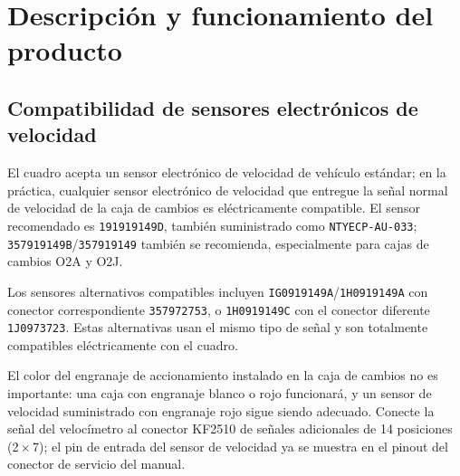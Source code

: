 \chapter{Descripci\'on y funcionamiento del producto}\label{ch:description}

\section{Compatibilidad de sensores electr\'onicos de velocidad}
El cuadro acepta un sensor electr\'onico de velocidad de veh\'iculo est\'andar; en la pr\'actica, cualquier sensor electr\'onico de velocidad que entregue la se\~nal normal de velocidad de la caja de cambios es el\'ectricamente compatible.
El sensor recomendado es \texttt{191919149D}, tambi\'en suministrado como \texttt{NTYECP-AU-033}; \texttt{357919149B}/\texttt{357919149} tambi\'en se recomienda, especialmente para cajas de cambios O2A y O2J.

Los sensores alternativos compatibles incluyen \texttt{IG0919149A}/\texttt{1H0919149A} con conector correspondiente \texttt{357972753}, o \texttt{1H0919149C} con el conector diferente \texttt{1J0973723}.
Estas alternativas usan el mismo tipo de se\~nal y son totalmente compatibles el\'ectricamente con el cuadro.

El color del engranaje de accionamiento instalado en la caja de cambios no es importante: una caja con engranaje blanco o rojo funcionar\'a, y un sensor de velocidad suministrado con engranaje rojo sigue siendo adecuado.
Conecte la se\~nal del veloc\'imetro al conector KF2510 de se\~nales adicionales de 14 posiciones (2\,$\times$\,7); el pin de entrada del sensor de velocidad ya se muestra en el pinout del conector de servicio del manual.
